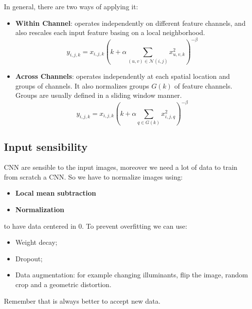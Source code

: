 In general, there are two ways of applying it:
\begin{itemize}
    \item \textbf{Within Channel}: operates independently on different feature
          channels, and also rescales each input feature basing on a local
          neighborhood.
          \begin{equation}
              y_{i, j, k} = x_{i, j, k} \left(k + \alpha \sum_{(u, v) \in \mathcal{N}(i, j)} x_{u, v, k}^2 \right)^{-\beta}
          \end{equation}
    \item \textbf{Across Channels}: operates independently at each spatial location
          and groups of channels. It also normalizes groups $G(k)$ of feature
          channels. Groups are usually defined in a sliding window manner.
          \begin{equation}
              y_{i, j, k} = x_{i, j, k} \left(k + \alpha \sum_{q \in G(k)} x_{i, j, q}^2 \right)^{-\beta}
          \end{equation}
\end{itemize}

\subsection{Input sensibility}
CNN are sensible to the input images, moreover we need a lot of data to train
from scratch a CNN. So we have to normalize images using:
\begin{itemize}
    \item \textbf{Local mean subtraction}
    \item \textbf{Normalization}
\end{itemize}
to have data centered in 0. To prevent overfitting we can use:
\begin{itemize}
    \item Weight decay;
    \item Dropout;
    \item Data augmentation: for example changing illuminants, flip the image,
          random crop and a geometric distortion.
\end{itemize}
Remember that is always better to accept new data.

